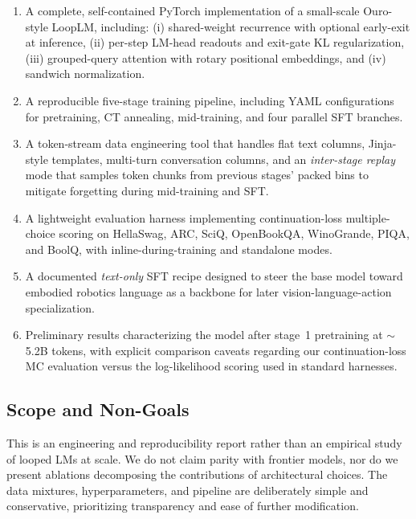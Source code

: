 \documentclass[11pt,a4paper]{article}
\begin{document}
\begin{enumerate}[leftmargin=*]
  \item A complete, self-contained PyTorch implementation of a small-scale
    Ouro-style LoopLM, including: (i) shared-weight recurrence with optional
    early-exit at inference, (ii) per-step LM-head readouts and exit-gate
    KL regularization, (iii) grouped-query attention with rotary
    positional embeddings, and (iv) sandwich normalization.
  \item A reproducible five-stage training pipeline, including YAML
    configurations for pretraining, CT annealing, mid-training, and four
    parallel SFT branches.
  \item A token-stream data engineering tool that handles flat text columns,
    Jinja-style templates, multi-turn conversation columns, and an
    \emph{inter-stage replay} mode that samples token chunks from previous
    stages' packed bins to mitigate forgetting during mid-training and SFT.
  \item A lightweight evaluation harness implementing continuation-loss
    multiple-choice scoring on HellaSwag, ARC, SciQ, OpenBookQA,
    WinoGrande, PIQA, and BoolQ, with inline-during-training and
    standalone modes.
  \item A documented \emph{text-only} SFT recipe designed to steer the base
    model toward embodied robotics language as a backbone for later
    vision-language-action specialization.
  \item Preliminary results characterizing the model after stage~1 pretraining
    at $\sim$5.2B tokens, with explicit comparison
    caveats regarding our continuation-loss MC evaluation versus the
    log-likelihood scoring used in standard harnesses.
\end{enumerate}

\subsection{Scope and Non-Goals}

This is an engineering and reproducibility report rather than an empirical
study of looped LMs at scale. We do not claim parity with frontier models, nor
do we present ablations decomposing the contributions of architectural
choices. The data mixtures, hyperparameters, and pipeline are deliberately
simple and conservative, prioritizing transparency and ease of further
modification.

\end{document}
